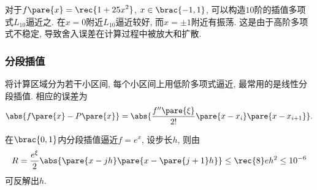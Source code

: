 \documentclass[hidelinks]{ctexart}
\begin{document}
\begin{ex}
    对于$\displaystyle f\pare{x} = \rec{1+25x^2}$, $x\in \brac{-1,1}$, 可以构造$10$阶的插值多项式$L_{10}$逼近之. 在$x=0$附近$L_{10}$逼近较好, 而$x = \pm 1$附近有振荡. 这是由于高阶多项式不稳定, 导致舍入误差在计算过程中被放大和扩散.
\end{ex}


\subsubsection{分段插值} %
\label{ssub:分段插值}

将计算区域分为若干小区间, 每个小区间上用低阶多项式逼近, 最常用的是线性分段插值. 相应的误差为
\[ \abs{f\pare{x} - P\pare{x}} = \abs{\frac{f''\pare{\xi}}{2!}\pare{x-x_i}\pare{x-x_{i+1}}}. \]
\begin{ex}
    在$\brac{0,1}$内分段插值逼近$f=e^x$, 设步长$h$, 则由
    \[ R = \frac{e^\xi}{2}\abs{\pare{x-jh}\pare{x-\pare{j+1}h}} \le \rec{8}eh^2 \le 10^{-6} \]
    可反解出$h$.
\end{ex}



\end{document}
